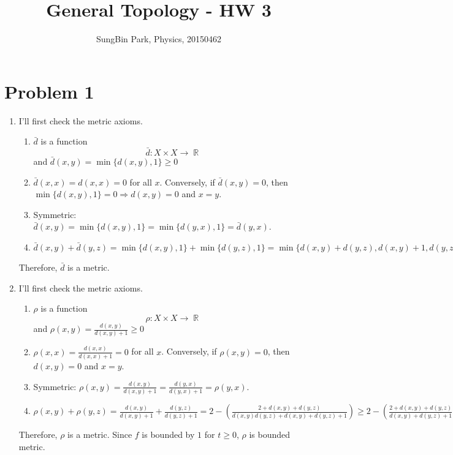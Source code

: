 \documentclass{article}
\DeclareMathOperator{\rr}{\mathbb{R}}
\begin{document}
\title{General Topology - HW 3}
\author{SungBin Park, Physics, 20150462} 

 \maketitle
\section*{Problem 1}
\begin{enumerate}
\item[A.] I'll first check the metric axioms.
\begin{enumerate}
\item $\bar{d}$ is a function
\begin{equation*}
\bar{d}:X\times X\longrightarrow \rr
\end{equation*}
and $\bar{d}(x,y)=\min\{d(x,y), 1\}\geq 0$
\item $\bar{d}(x,x)=d(x, x)=0$ for all $x$. Conversely, if $\bar{d}(x,y)=0$, then $\min\{d(x,y), 1\}=0\Rightarrow d(x,y)=0$ and $x=y$.
\item Symmetric: $\bar{d}(x,y)=\min\{d(x,y), 1\}=\min\{d(y,x), 1\}=\bar{d}(y,x)$.
\item $\bar{d}(x,y)+\bar{d}(y,z)=\min\{d(x,y), 1\}+\min\{d(y,z), 1\}= \min\{d(x,y)+d(y,z), d(x,y)+1, d(y,z)+1, 2\}\geq \min\{d(x,y)+d(y,z), 1\}\geq \min\{d(x,z), 1\}=\bar{d}(x,z)$
\end{enumerate}
Therefore, $\bar{d}$ is a metric.
\item[B.] I'll first check the metric axioms.
\begin{enumerate}
\item $\rho$ is a function
\begin{equation*}
\rho:X\times X\longrightarrow \rr
\end{equation*}
and $\rho(x,y)=\frac{d(x, y)}{d(x,y)+1}\geq 0$
\item $\rho(x,x)=\frac{d(x, x)}{d(x,x)+1}=0$ for all $x$. Conversely, if $\rho(x,y)=0$, then $d(x,y)=0$ and $x=y$.
\item Symmetric: $\rho(x,y)=\frac{d(x,y)}{d(x,y)+1}=\frac{d(y,x)}{d(y,x)+1}=\rho(y,x)$.
\item $\rho(x,y)+\rho(y,z)=\frac{d(x, y)}{d(x,y)+1}+\frac{d(y, z)}{d(y,z)+1}=2- \left(\frac{2+d(x, y)+d(y, z)}{d(x,y)d(y,z)+d(x,y)+d(y,z)+1}\right)\geq 2- \left(\frac{2+d(x, y)+d(y, z)}{d(x,y)+d(y,z)+1}\right)=2- \left(1+\frac{1}{d(x,y)+d(y,z)+1}\right)\geq 2- \left(1+\frac{1}{d(x,z)+1}\right)=\rho(x,z)$
\end{enumerate}
Therefore, $\rho$ is a metric. Since $f$ is bounded by $1$ for $t\geq 0$, $\rho$ is bounded metric.
\end{enumerate}
\end{document}
